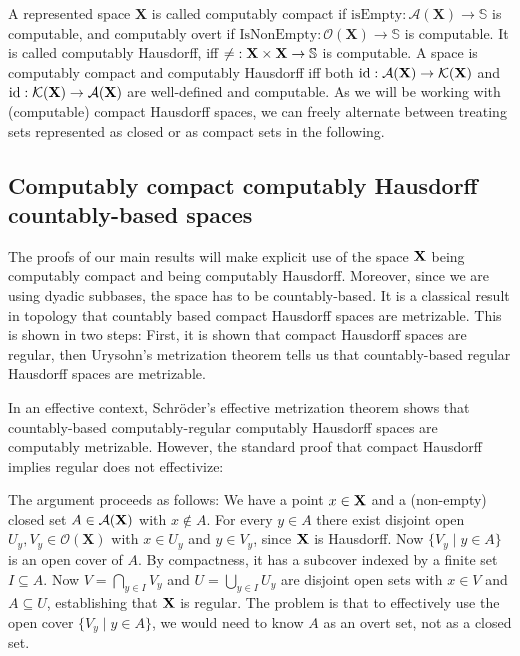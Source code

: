 \documentclass{eptcs-modified}
\begin{document}
A represented space $\mathbf{X}$ is called computably compact if $\textrm{isEmpty} : \mathcal{A}(\mathbf{X}) \to \mathbb{S}$ is computable,
and computably overt if $\textrm{IsNonEmpty}: \mathcal{O}(\mathbf{X}) \to \mathbb{S}$ is computable.
It is called computably Hausdorff, iff $\mathalpha{\neq} : \mathbf{X} \times \mathbf{X} \to \mathbb{S}$ is computable. A space is computably compact and computably Hausdorff iff both $\textnormal{id} : \mathcal{A}(\mathbf{X}) \to \mathcal{K}(\mathbf{X})$ and $\textnormal{id} : \mathcal{K}(\mathbf{X}) \to \mathcal{A}(\mathbf{X})$ are well-defined and computable. As we will be working with (computable) compact Hausdorff spaces, we can freely alternate between treating sets represented as closed or as compact sets in the following.

\subsection{Computably compact computably Hausdorff countably-based spaces}
The proofs of our main results will make explicit use of the space $\mathbf{X}$ being computably compact and being computably Hausdorff. Moreover, since we are using dyadic subbases, the space has to be countably-based. It is a classical result in topology that countably based compact Hausdorff spaces are metrizable. This is shown in two steps: First, it is shown that compact Hausdorff spaces are regular, then Urysohn's metrization theorem tells us that countably-based regular Hausdorff spaces are metrizable.

In an effective context, Schr\"oder's effective metrization theorem \cite{grubba3,schroder8} shows that countably-based computably-regular computably Hausdorff spaces are computably metrizable. However, the standard proof that compact Hausdorff implies regular does not effectivize:

The argument proceeds as follows: We have a point $x \in \mathbf{X}$ and a (non-empty) closed set $A \in \mathcal{A}(\mathbf{X})$ with $x \notin A$. For every $y \in A$ there exist disjoint open $U_y, V_y \in \mathcal{O}(\mathbf{X})$ with $x \in U_y$ and $y \in V_y$, since $\mathbf{X}$ is Hausdorff. Now $\{V_y \mid y \in A\}$ is an open cover of $A$. By compactness, it has a subcover indexed by a finite set $I \subseteq A$. Now $V = \bigcap_{y \in I} V_y$ and $U = \bigcup_{y \in I} U_y$ are disjoint open sets with $x \in V$ and $A \subseteq U$, establishing that $\mathbf{X}$ is regular. The problem is that to effectively use the open cover $\{V_y \mid y \in A\}$, we would need to know $A$ as an overt set, not as a closed set.
\end{document}
